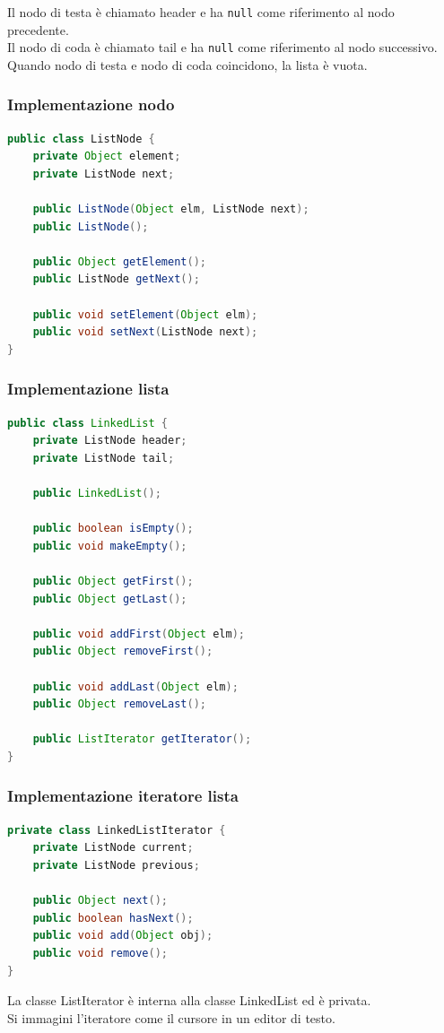 \documentclass{article}
\begin{document}
Il nodo di testa è chiamato header e ha \verb|null| come riferimento al nodo precedente. \\
Il nodo di coda è chiamato tail e ha \verb|null| come riferimento al nodo successivo. \\
Quando nodo di testa e nodo di coda coincidono, la lista è vuota.

\subsubsection*{Implementazione nodo}
\begin{lstlisting}[language=Java]
public class ListNode {
	private Object element;
	private ListNode next;

	public ListNode(Object elm, ListNode next);
	public ListNode();

	public Object getElement();
	public ListNode getNext();

	public void setElement(Object elm);
	public void setNext(ListNode next);
}
\end{lstlisting}

\subsubsection*{Implementazione lista}
\begin{lstlisting}[language=Java]
public class LinkedList {
	private ListNode header;
	private ListNode tail;

	public LinkedList();

	public boolean isEmpty();
	public void makeEmpty();

	public Object getFirst();
	public Object getLast();

	public void addFirst(Object elm);
	public Object removeFirst();

	public void addLast(Object elm);
	public Object removeLast();

	public ListIterator getIterator();
}
\end{lstlisting}

\subsubsection*{Implementazione iteratore lista}
\begin{lstlisting}[language=Java]
private class LinkedListIterator {
	private ListNode current;
	private ListNode previous;

	public Object next();
	public boolean hasNext();
	public void add(Object obj);
	public void remove();
}
\end{lstlisting}
La classe ListIterator è interna alla classe LinkedList ed è privata. \\
Si immagini l'iteratore come il cursore in un editor di testo.
\end{document}
